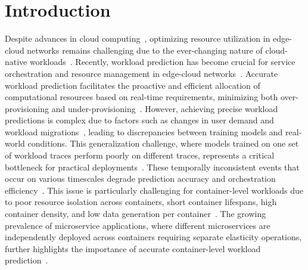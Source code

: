 \section{Introduction}
\label{sec:ch4_introduction}

Despite advances in cloud computing~\cite{shang2023online}, optimizing resource utilization in edge-cloud networks remains challenging due to the ever-changing nature of cloud-native workloads~\cite{10646623}. Recently, workload prediction has become crucial for service orchestration and resource management in edge-cloud networks~\cite{10068185}. Accurate workload prediction facilitates the proactive and efficient allocation of computational resources based on real-time requirements, minimizing both over-provisioning and under-provisioning~\cite{10229064, 8258257, 9068614}. However, achieving precise workload predictions is complex due to factors such as changes in user demand and workload migrations~\cite{ouyang2023dynamic}, leading to discrepancies between training models and real-world conditions. This generalization challenge, where models trained on one set of workload traces perform poorly on different traces, represents a critical bottleneck for practical deployments~\cite{zou2024generalization}. These temporally inconsistent events that occur on various timescales degrade prediction accuracy and orchestration efficiency~\cite{10029931}. This issue is particularly challenging for container-level workloads due to poor resource isolation across containers, short container lifespans, high container density, and low data generation per container~\cite{10417087, 10202641}. The growing prevalence of microservice applications, where different microservices are independently deployed across containers requiring separate elasticity operations, further highlights the importance of accurate container-level workload prediction~\cite{10202641, shang2023online, 10052731}.

